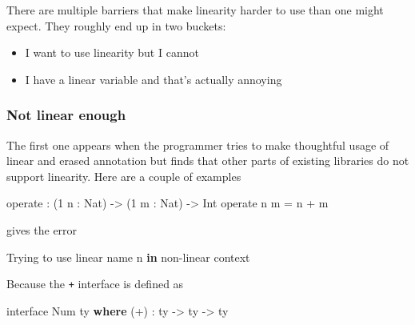 \documentclass[
]{article}
\newenvironment{Shaded}{}{}
\newcommand{\DataTypeTok}[1]{\textcolor[rgb]{0.56,0.13,0.00}{#1}}
\newcommand{\DecValTok}[1]{\textcolor[rgb]{0.25,0.63,0.44}{#1}}
\newcommand{\KeywordTok}[1]{\textcolor[rgb]{0.00,0.44,0.13}{\textbf{#1}}}
\newcommand{\NormalTok}[1]{#1}
\newcommand{\OperatorTok}[1]{\textcolor[rgb]{0.40,0.40,0.40}{#1}}
\newcommand{\OtherTok}[1]{\textcolor[rgb]{0.00,0.44,0.13}{#1}}
\providecommand{\tightlist}{%
  \setlength{\itemsep}{0pt}\setlength{\parskip}{0pt}}
\begin{document}
There are multiple barriers that make linearity harder to use than one
might expect. They roughly end up in two buckets:

\begin{itemize}
\tightlist
\item
  I want to use linearity but I cannot
\item
  I have a linear variable and that's actually annoying
\end{itemize}

\hypertarget{not-linear-enough}{%
\subsubsection{Not linear enough}\label{not-linear-enough}}

The first one appears when the programmer tries to make thoughtful usage
of linear and erased annotation but finds that other parts of existing
libraries do not support linearity. Here are a couple of examples

\begin{Shaded}
\begin{Highlighting}[]
\NormalTok{operate }\OperatorTok{:}\NormalTok{ (}\DecValTok{1}\NormalTok{ n }\OperatorTok{:} \DataTypeTok{Nat}\NormalTok{) }\OtherTok{{-}\textgreater{}}\NormalTok{ (}\DecValTok{1}\NormalTok{ m }\OperatorTok{:} \DataTypeTok{Nat}\NormalTok{) }\OtherTok{{-}\textgreater{}} \DataTypeTok{Int}
\NormalTok{operate n m }\OtherTok{=}\NormalTok{ n }\OperatorTok{+}\NormalTok{ m}
\end{Highlighting}
\end{Shaded}

gives the error

\begin{Shaded}
\begin{Highlighting}[]
\DataTypeTok{Trying}\NormalTok{ to use linear name n }\KeywordTok{in}\NormalTok{ non}\OperatorTok{{-}}\NormalTok{linear context}
\end{Highlighting}
\end{Shaded}

Because the \texttt{+} interface is defined as

\begin{Shaded}
\begin{Highlighting}[]
\NormalTok{interface }\DataTypeTok{Num}\NormalTok{ ty }\KeywordTok{where}
\NormalTok{    (}\OperatorTok{+}\NormalTok{) }\OperatorTok{:}\NormalTok{ ty }\OtherTok{{-}\textgreater{}}\NormalTok{ ty }\OtherTok{{-}\textgreater{}}\NormalTok{ ty}
\end{Highlighting}
\end{Shaded}
\end{document}

